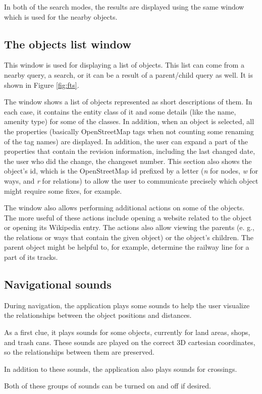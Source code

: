\documentclass[nolof,digital]{fithesis3}
\begin{document}
In both of the search modes, the results are displayed using the same window which is used for the nearby objects.
\subsection{The objects list window}
This window is used for displaying a list of objects. This list can come from a nearby query, a search, or it can be a result of a parent/child query as well. It is shown in Figure \ref{fig:fts}.

The window shows a list of objects represented as short descriptions of them. In each case, it contains the entity class of it and some details (like the name, amenity type) for some of the classes. In addition, when an object is selected, all the properties (basically OpenStreetMap tags when not counting some renaming of the tag names) are displayed. In addition, the user can expand a part of the properties that contain the revision information, including the last changed date, the user who did the change, the changeset number. This section also shows the object's id, which is the OpenStreetMap id prefixed by a letter (\emph{n} for nodes, \emph{w} for ways, and \emph{r} for relations) to allow the user to communicate precisely which object might require some fixes, for example.

The window also allows performing additional actions on some of the objects. The more useful of these actions include opening a website related to the object or opening its Wikipedia entry. The actions also allow viewing the parents (e. g., the relations or ways that contain the given object) or the object's children. The parent object might be helpful to, for example, determine the railway line for a part of its tracks.
\subsection{Navigational sounds}
During navigation, the application plays some sounds to help the user visualize the relationships between the object positions and distances.

As a first clue, it plays sounds for some objects, currently for land areas, shops, and trash cans. These sounds are played on the correct 3D cartesian coordinates, so the relationships between them are preserved.

In addition to these sounds, the application also plays sounds for crossings.

Both of these groups of sounds can be turned on and off if desired.
\end{document}

